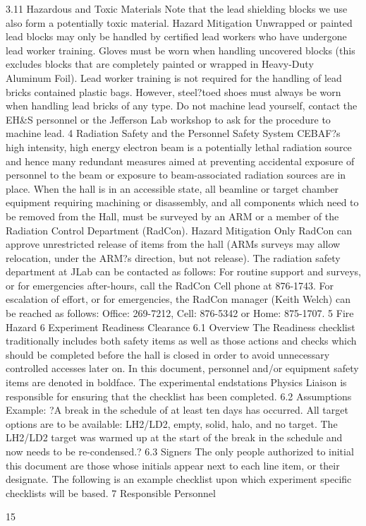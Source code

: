 {3.11		Hazardous and Toxic Materials
Note that the lead shielding blocks we use also form a potentially toxic material.
Hazard Mitigation
	Unwrapped or painted lead blocks may only be handled by certified lead workers who have undergone lead worker training. Gloves must be worn when handling uncovered blocks (this excludes blocks that are completely painted or wrapped in Heavy-Duty Aluminum Foil). Lead worker training is not required for the handling of lead bricks contained plastic bags. However, steel?toed shoes must always be worn when handling lead bricks of any type. Do not machine lead yourself, contact the EH\&S personnel or the Jefferson Lab workshop to ask for the procedure to machine lead.	
4		Radiation Safety and the Personnel Safety System
	CEBAF?s high intensity, high energy electron beam is a potentially lethal radiation source and hence many redundant measures aimed at preventing accidental exposure of personnel to the beam or exposure to beam-associated radiation sources are in place. When the hall is in an accessible state, all beamline or target chamber equipment requiring machining or disassembly, and all components which need to be removed from the Hall, must be surveyed by an ARM or a member of the Radiation Control Department (RadCon). 
Hazard Mitigation
	Only RadCon can approve unrestricted release of items from the hall (ARMs surveys may allow relocation, under the ARM?s direction, but not release). The radiation safety department at JLab can be contacted as follows: For routine support and surveys, or for emergencies after-hours, call the RadCon Cell phone at 876-1743. For escalation of effort, or for emergencies, the RadCon manager (Keith Welch) can be reached as follows: Office: 269-7212, Cell: 876-5342 or Home:  875-1707.
5		Fire Hazard
6		Experiment Readiness Clearance
6.1	Overview
	The Readiness checklist traditionally includes both safety items as well as those actions and checks which should be completed before the hall is closed in order to avoid unnecessary controlled accesses later on. In this document, personnel and/or equipment safety items are denoted in boldface. The experimental endstations Physics Liaison is responsible for ensuring that the checklist has been completed.
6.2	Assumptions 
	Example: ?A break in the schedule of at least ten days has occurred. All target options are to be available: LH2/LD2, empty, solid, halo, and no target. The LH2/LD2 target was warmed up at the start of the break in the schedule and now needs to be re-condensed.?
6.3	Signers 
	The only people authorized to initial this document are those whose initials appear next to each line item, or their designate. The following is an example checklist upon which experiment specific checklists will be based.
7 		Responsible Personnel




15
}


